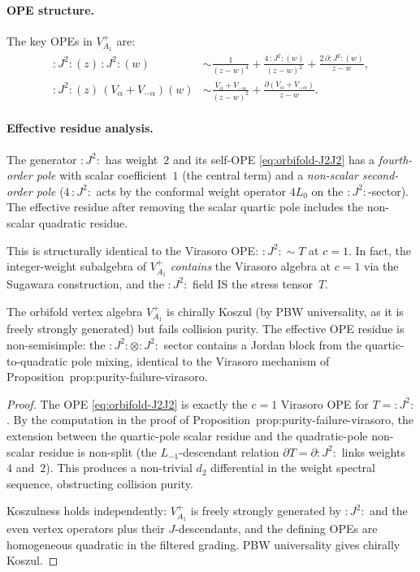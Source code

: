 \documentclass[11pt]{article}
\begin{document}
\paragraph{OPE structure.}
The key OPEs in $V_{A_1}^{+}$ are:
\begin{align}
:J^2:(z)\, :J^2:(w) &\sim
  \frac{1}{(z-w)^4} + \frac{4\,:J^2:(w)}{(z-w)^2}
  + \frac{2\,\partial :J^2:(w)}{z-w},
  \label{eq:orbifold-J2J2}\\
:J^2:(z)\, (V_\alpha + V_{-\alpha})(w) &\sim
  \frac{V_\alpha + V_{-\alpha}}{(z-w)^2}
  + \frac{\partial(V_\alpha + V_{-\alpha})}{z-w}.
  \label{eq:orbifold-J2V}
\end{align}

\paragraph{Effective residue analysis.}
The generator $:J^2:$ has weight~$2$ and its self-OPE
\eqref{eq:orbifold-J2J2} has a \emph{fourth-order pole}
with scalar coefficient~$1$ (the central term) and a
\emph{non-scalar second-order pole} ($4\,:J^2:$ acts
by the conformal weight operator $4L_0$ on the
$:J^2:$-sector).  The effective residue after removing
the scalar quartic pole includes the non-scalar quadratic
residue.

This is structurally identical to the Virasoro OPE:
$:J^2: \sim T$ at $c = 1$.  In fact, the integer-weight
subalgebra of $V_{A_1}^{+}$ \emph{contains} the
Virasoro algebra at $c = 1$ via the Sugawara construction,
and the $:J^2:$ field IS the stress tensor~$T$.

\begin{proposition}
\label{prop:orbifold-A1-koszul}
The orbifold vertex algebra $V_{A_1}^{+}$ is chirally
Koszul \textup{(}by PBW universality, as it is freely
strongly generated\textup{)} but fails collision purity.
The effective OPE residue is non-semisimple: the
$:J^2: \otimes :J^2:$ sector contains a Jordan block
from the quartic-to-quadratic pole mixing, identical
to the Virasoro mechanism of
Proposition~prop:purity-failure-virasoro.
\end{proposition}

\begin{proof}
The OPE \eqref{eq:orbifold-J2J2} is exactly the
$c = 1$ Virasoro OPE for $T = :J^2:$.  By the
computation in the proof of
Proposition~prop:purity-failure-virasoro,
the extension between the quartic-pole scalar residue
and the quadratic-pole non-scalar residue is non-split
(the $L_{-1}$-descendant relation $\partial T = \partial :J^2:$
links weights~$4$ and~$2$).  This produces a non-trivial
$d_2$ differential in the weight spectral sequence,
obstructing collision purity.

Koszulness holds independently: $V_{A_1}^{+}$ is freely
strongly generated by $:J^2:$ and the even vertex
operators plus their $J$-descendants, and the defining
OPEs are homogeneous quadratic in the filtered grading.
PBW universality gives chirally Koszul.
\end{proof}
\end{document}
